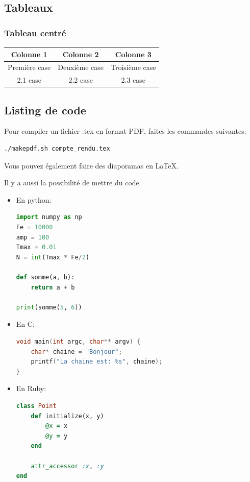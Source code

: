 \documentclass[a4paper,french,titlepage]{article} \usepackage{knonn_layout}
\begin{document}
		\subsection{Tableaux}
			\subsubsection{Tableau centré}
				\begin{center}
					\begin{tabular}{| c | c | c |} %
						\hline
						Colonne 1 & Colonne 2 & Colonne 3\\ \hline\hline
						Première case & Deuxième case & Troisième case\\ \hline
						2.1 case & 2.2 case & 2.3 case\\ \hline
					\end{tabular}
				\end{center}

		\subsection{Listing de code}
			Pour compiler un fichier .tex en format PDF, faites les commandes suivantes:
			\begin{lstlisting}
./makepdf.sh compte_rendu.tex
			\end{lstlisting}
			Vous pouvez également faire des diaporamas en \LaTeX.

			Il y a aussi la possibilité de mettre du code
			\begin{itemize}
				\item En python:
					\begin{lstlisting}[language=python]
import numpy as np
Fe = 10000
amp = 100
Tmax = 0.01
N = int(Tmax * Fe/2)

def somme(a, b):
	return a + b

print(somme(5, 6))
					\end{lstlisting}
				\item En C:
					\begin{lstlisting}[language=C]
void main(int argc, char** argv) {
	char* chaine = "Bonjour";
	printf("La chaine est: %s", chaine);
}
					\end{lstlisting}
				\item En Ruby:
					\begin{lstlisting}[language=Ruby]
class Point
	def initialize(x, y)
		@x = x
		@y = y
	end

	attr_accessor :x, :y
end
					\end{lstlisting}
			\end{itemize}
\end{document}
